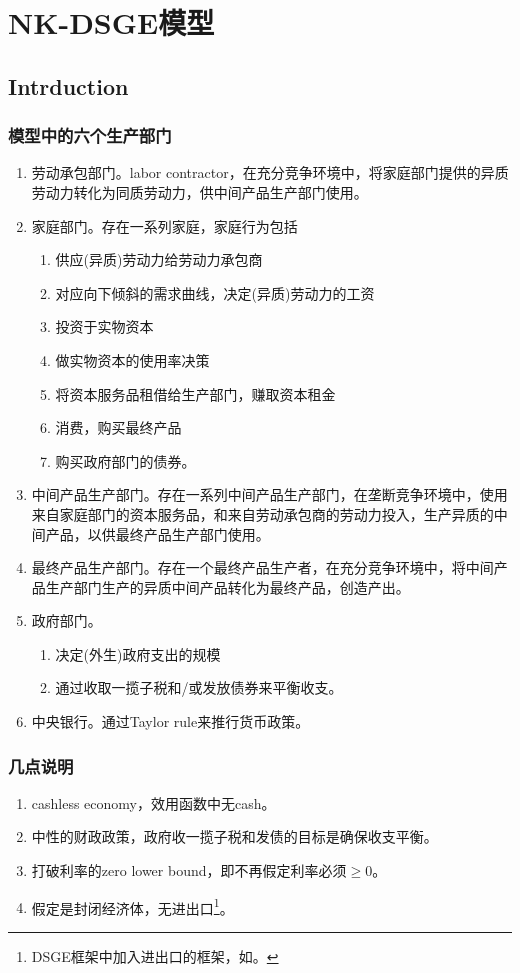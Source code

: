 \chapter{NK-DSGE模型}
\label{sec:MSDSGE}

\section{Intrduction}
\label{sec:MSDSGE-intro}

\subsection{模型中的六个生产部门}
\label{sec:MSDSGE-sectors}
\begin{enumerate}
\item{劳动承包部门}。labor contractor，在充分竞争环境中，将家庭部门提供的异质劳动力转化为同质劳动力，供中间产品生产部门使用。
\item{家庭部门}。存在一系列家庭，家庭行为包括
\begin{enumerate}
\item 供应(异质)劳动力给劳动力承包商
\item 对应向下倾斜的需求曲线，决定(异质)劳动力的工资
\item 投资于实物资本
\item 做实物资本的使用率决策
\item 将资本服务品租借给生产部门，赚取资本租金
\item 消费，购买最终产品
\item 购买政府部门的债券。
\end{enumerate}
\item{中间产品生产部门}。存在一系列中间产品生产部门，在垄断竞争环境中，使用来自家庭部门的资本服务品，和来自劳动承包商的劳动力投入，生产异质的中间产品，以供最终产品生产部门使用。
\item{最终产品生产部门}。存在一个最终产品生产者，在充分竞争环境中，将中间产品生产部门生产的异质中间产品转化为最终产品，创造产出。
\item{政府部门}。
\begin{enumerate}
\item 决定(外生)政府支出的规模
\item 通过收取一揽子税和/或发放债券来平衡收支。
\end{enumerate}
\item{中央银行}。通过Taylor rule来推行货币政策。
\end{enumerate}

\subsection{几点说明}
\begin{enumerate}
\item cashless economy，效用函数中无cash。
\item 中性的财政政策，政府收一揽子税和发债的目标是确保收支平衡。
\item 打破利率的zero lower bound，即不再假定利率必须$\ge 0$。
\item 假定是封闭经济体，无进出口\footnote{DSGE框架中加入进出口的框架，如\cite{Svensson:2010wq}。}。
\end{enumerate}

